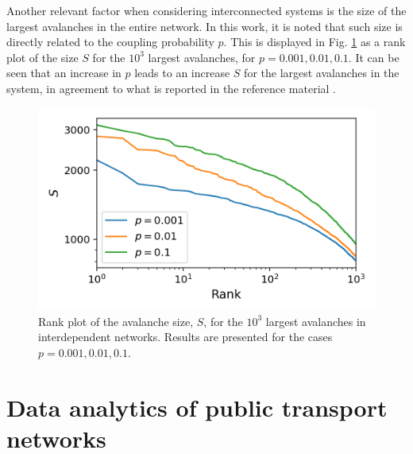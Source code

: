 Another relevant factor when considering interconnected systems is the size of the largest avalanches in the entire network. In this work, it is noted that such size is directly related to the coupling probability $p$. This is displayed in Fig. \ref{fig:SM_large_avalanche_rank_plot_joint_AB} as a rank plot of the size $S$ for the $10^3$ largest avalanches, for $p=0.001, 0.01, 0.1$. It can be seen that an increase in $p$ leads to an increase $S$ for the largest avalanches in the system, in agreement to what is reported in the reference material \cite{brummitt2012suppressing}.


\begin{figure}[!h]
	\begin{center}
	\includegraphics[scale=0.75]{./images/task_15/SM_large_avalanche_rank_plot_joint_AB.png} 
	\end{center}
	\caption{Rank plot of the avalanche size, $S$, for the $10^3$ largest avalanches in interdependent networks. Results are presented for the cases $p=0.001, 0.01, 0.1$. \\} 
	\label{fig:SM_large_avalanche_rank_plot_joint_AB} 
\end{figure}



\section{Data analytics of public transport networks}
\label{sec:DATN_SM}

